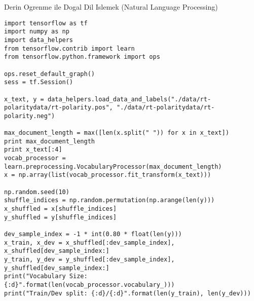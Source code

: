 \documentclass[12pt,fleqn]{article}\usepackage{../../common}
\begin{document}
Derin Ogrenme ile Dogal Dil Islemek (Natural Language Processing)

\begin{verbatim}
import tensorflow as tf
import numpy as np
import data_helpers
from tensorflow.contrib import learn
from tensorflow.python.framework import ops

ops.reset_default_graph()
sess = tf.Session()

x_text, y = data_helpers.load_data_and_labels("./data/rt-polaritydata/rt-polarity.pos", "./data/rt-polaritydata/rt-polarity.neg")

max_document_length = max([len(x.split(" ")) for x in x_text])
print max_document_length
print x_text[:4]
vocab_processor = learn.preprocessing.VocabularyProcessor(max_document_length)
x = np.array(list(vocab_processor.fit_transform(x_text)))

np.random.seed(10)
shuffle_indices = np.random.permutation(np.arange(len(y)))
x_shuffled = x[shuffle_indices]
y_shuffled = y[shuffle_indices]

dev_sample_index = -1 * int(0.80 * float(len(y)))
x_train, x_dev = x_shuffled[:dev_sample_index], x_shuffled[dev_sample_index:]
y_train, y_dev = y_shuffled[:dev_sample_index], y_shuffled[dev_sample_index:]
print("Vocabulary Size: {:d}".format(len(vocab_processor.vocabulary_)))
print("Train/Dev split: {:d}/{:d}".format(len(y_train), len(y_dev)))
\end{verbatim}
\end{document}
